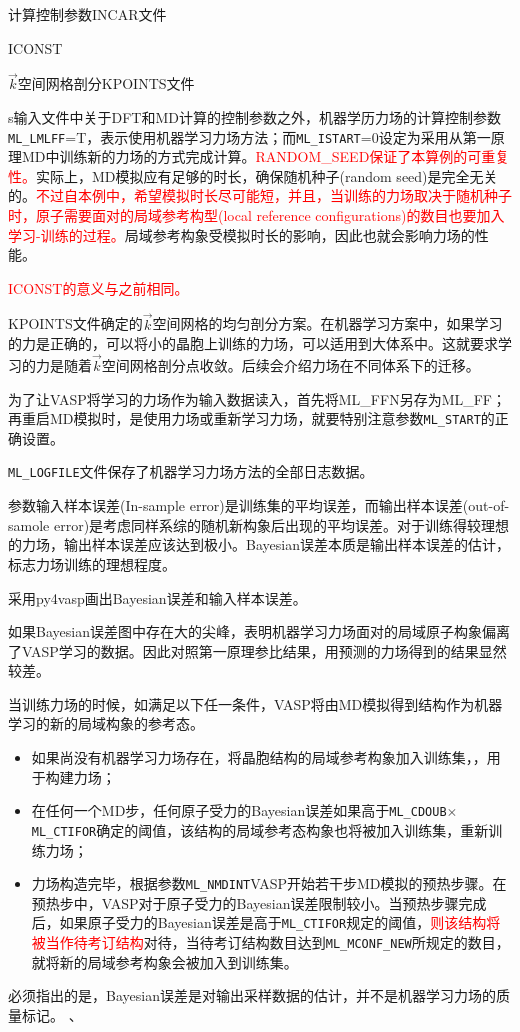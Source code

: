 计算控制参数\textrm{INCAR}文件

\textrm{ICONST}

$\vec k$空间网格剖分\textrm{KPOINTS}文件

s输入文件中关于\textrm{DFT}和\textrm{MD}计算的控制参数之外，机器学历力场的计算控制参数\texttt{ML\_LMLFF}=\textrm{T}，表示使用机器学习力场方法；而\texttt{ML\_ISTART}=0设定为采用从第一原理\textrm{MD}中训练新的力场的方式完成计算。\textcolor{red}{\textrm{RANDOM\_SEED}保证了本算例的可重复性。}实际上，\textrm{MD}模拟应有足够的时长，确保随机种子\textrm{(random seed)}是完全无关的。\textcolor{red}{不过自本例中，希望模拟时长尽可能短，并且，当训练的力场取决于随机种子时，原子需要面对的局域参考构型\textrm{(local reference configurations)}的数目也要加入学习-训练的过程。}局域参考构象受模拟时长的影响，因此也就会影响力场的性能。

\textcolor{red}{\textrm{ICONST}的意义与之前相同。}

\textrm{KPOINTS}文件确定的$\vec k$空间网格的均匀剖分方案。在机器学习方案中，如果学习的力是正确的，可以将小的晶胞上训练的力场，可以适用到大体系中。这就要求学习的力是随着$\vec k$空间网格剖分点收敛。后续会介绍力场在不同体系下的迁移。

为了让\textrm{VASP}将学习的力场作为输入数据读入，首先将\textrm{ML\_FFN}另存为\textrm{ML\_FF}；再重启\textrm{MD}模拟时，是使用力场或重新学习力场，就要特别注意参数\texttt{ML\_START}的正确设置。

\texttt{ML\_LOGFILE}文件保存了机器学习力场方法的全部日志数据。

参数输入样本误差\textrm{(In-sample error)}是训练集的平均误差，而输出样本误差\textrm{(out-of-samole error)}是考虑同样系综的随机新构象后出现的平均误差。对于训练得较理想的力场，输出样本误差应该达到极小。\textrm{Bayesian}误差本质是输出样本误差的估计，标志力场训练的理想程度。

采用\textrm{py4vasp}画出\textrm{Bayesian}误差和输入样本误差。

如果\textrm{Bayesian}误差图中存在大的尖峰，表明机器学习力场面对的局域原子构象偏离了\textrm{VASP}学习的数据。因此对照第一原理参比结果，用预测的力场得到的结果显然较差。

当训练力场的时候，如满足以下任一条件，\textrm{VASP}将由\textrm{MD}模拟得到结构作为机器学习的新的局域构象的参考态。
\begin{itemize}
	\item 如果尚没有机器学习力场存在，将晶胞结构的局域参考构象加入训练集，，用于构建力场；
	\item 在任何一个\textrm{MD}步，任何原子受力的\textrm{Bayesian}误差如果高于\texttt{ML\_CDOUB}$\times$\texttt{ML\_CTIFOR}确定的阈值，该结构的局域参考态构象也将被加入训练集，重新训练力场；
	\item 力场构造完毕，根据参数\texttt{ML\_NMDINT}\textrm{VASP}开始若干步\textrm{MD}模拟的预热步骤。在预热步中，\textrm{VASP}对于原子受力的\textrm{Bayesian}误差限制较小。当预热步骤完成后，如果原子受力的\textrm{Bayesian}误差是高于\texttt{ML\_CTIFOR}规定的阈值，\textcolor{red}{则该结构将被当作待考订结构}对待，当待考订结构数目达到\texttt{ML\_MCONF\_NEW}所规定的数目，就将新的局域参考构象会被加入到训练集。
\end{itemize}
必须指出的是，\textrm{Bayesian}误差是对输出采样数据的估计，并不是机器学习力场的质量标记。
、
